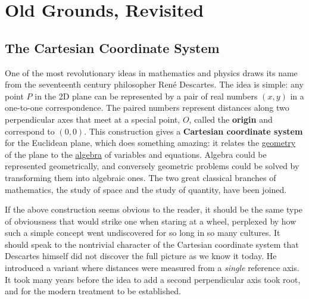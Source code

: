 \documentclass[../master.tex]{subfiles}
\begin{document}
\chapter{Old Grounds, Revisited}\thispagestyle{empty}
\section{The Cartesian Coordinate System} %
\label{sec:Cartesian}
	
	One of the most revolutionary ideas in mathematics and physics draws its name from the seventeenth century philosopher Ren\'{e} Descartes. The idea is simple: any point $P$ in the 2D plane can be represented by a pair of real numbers $(x,y)$ in a one-to-one correspondence. The paired numbers represent distances along two perpendicular axes that meet at a special point, $O$, called the \textbf{origin} and correspond to $(0,0)$. This construction gives a \textbf{Cartesian coordinate system} for the Euclidean plane, which does something amazing: it relates the \underline{geometry} of the plane to the \underline{algebra} of variables and equations. Algebra could be represented geometrically, and conversely geometric problems could be solved by transforming them into algebraic ones. The two great classical branches of mathematics, the study of space and the study of quantity, have been joined.
	
	
	If the above construction seems obvious to the reader, it should be the same type of obviousness that would strike one when staring at a wheel, perplexed by how such a simple concept went undiscovered for so long in so many cultures. It should speak to the nontrivial character of the Cartesian coordinate system that Descartes himself did not discover the full picture as we know it today. He introduced a variant where distances were measured from a \emph{single} reference axis. It took many years before the idea to add a second perpendicular axis took root, and for the modern treatment to be established.
	
	
\end{document}
